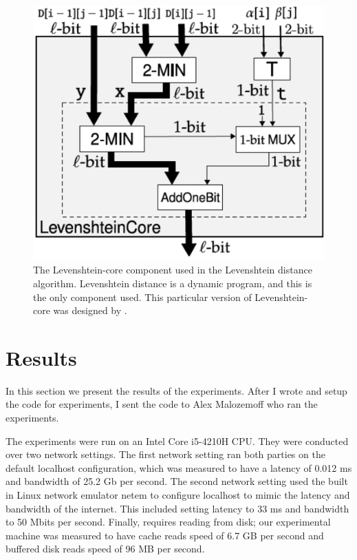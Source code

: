 \begin{figure}
    \center
    \includegraphics[scale=0.3]{images/leven_core}
    \caption[Levenshtein-core component]{The Levenshtein-core component used in the Levenshtein distance algorithm. 
    Levenshtein distance is a dynamic program, and this is the only component used. 
    This particular version of Levenshtein-core was designed by \cite{faster2pc}.}
    \label{fig:leven-core}
\end{figure}

\section{Results}

In this section we present the results of the experiments.
After I wrote \CompGC and setup the code for experiments, I sent the code to Alex Malozemoff who ran the experiments.

The experiments were run on an Intel Core i5-4210H CPU. 
They were conducted over two network settings. 
The first network setting ran both parties on the default localhost configuration, which was measured to have a latency of 0.012 ms and bandwidth of 25.2 Gb per second. 
The second network setting used the built in Linux network emulator {\sf netem} to configure localhost to mimic the latency and bandwidth of the internet. 
This included setting latency to 33 ms and bandwidth to 50 Mbits per second. 
Finally, \CompGC requires reading from disk; our experimental machine was measured to have cache reads speed of 6.7 GB per second and buffered disk reads speed of 96 MB per second.


